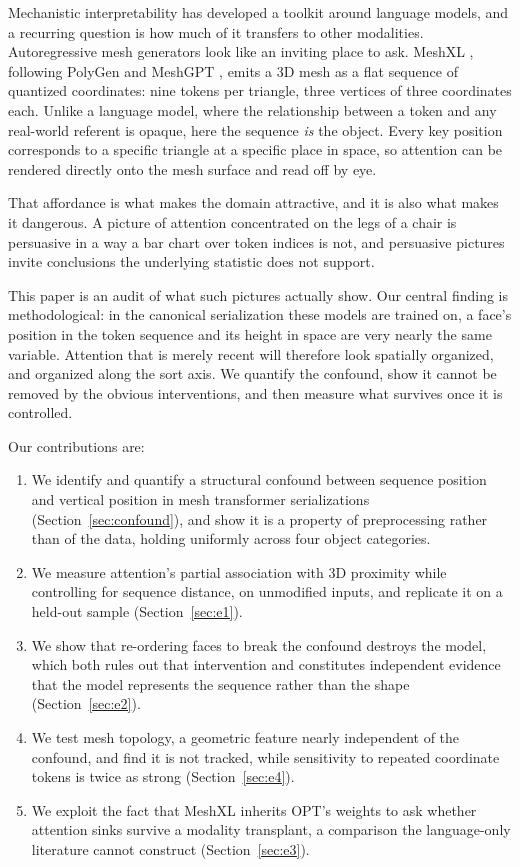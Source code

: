 \documentclass[conference]{IEEEtran}
\begin{document}
Mechanistic interpretability has developed a toolkit around language models, and
a recurring question is how much of it transfers to other modalities.
Autoregressive mesh generators look like an inviting place to ask. MeshXL
\cite{chen2024meshxl}, following PolyGen \cite{nash2020polygen} and MeshGPT
\cite{siddiqui2024meshgpt}, emits a 3D mesh as a flat sequence of quantized
coordinates: nine tokens per triangle, three vertices of three coordinates each.
Unlike a language model, where the relationship between a token and any
real-world referent is opaque, here the sequence \emph{is} the object. Every key
position corresponds to a specific triangle at a specific place in space, so
attention can be rendered directly onto the mesh surface and read off by eye.

That affordance is what makes the domain attractive, and it is also what makes it
dangerous. A picture of attention concentrated on the legs of a chair is
persuasive in a way a bar chart over token indices is not, and persuasive
pictures invite conclusions the underlying statistic does not support.

This paper is an audit of what such pictures actually show. Our central finding
is methodological: in the canonical serialization these models are trained on, a
face's position in the token sequence and its height in space are very nearly the
same variable. Attention that is merely recent will therefore look spatially
organized, and organized along the sort axis. We quantify the confound, show it
cannot be removed by the obvious interventions, and then measure what survives
once it is controlled.

Our contributions are:

\begin{enumerate}
\item We identify and quantify a structural confound between sequence position
and vertical position in mesh transformer serializations
(Section~\ref{sec:confound}), and show it is a property of preprocessing rather
than of the data, holding uniformly across four object categories.
\item We measure attention's partial association with 3D proximity while
controlling for sequence distance, on unmodified inputs, and replicate it on a
held-out sample (Section~\ref{sec:e1}).
\item We show that re-ordering faces to break the confound destroys the model,
which both rules out that intervention and constitutes independent evidence that
the model represents the sequence rather than the shape (Section~\ref{sec:e2}).
\item We test mesh topology, a geometric feature nearly independent of the
confound, and find it is not tracked, while sensitivity to repeated coordinate
tokens is twice as strong (Section~\ref{sec:e4}).
\item We exploit the fact that MeshXL inherits OPT's weights to ask whether
attention sinks survive a modality transplant, a comparison the language-only
literature cannot construct (Section~\ref{sec:e3}).
\end{enumerate}
\end{document}
